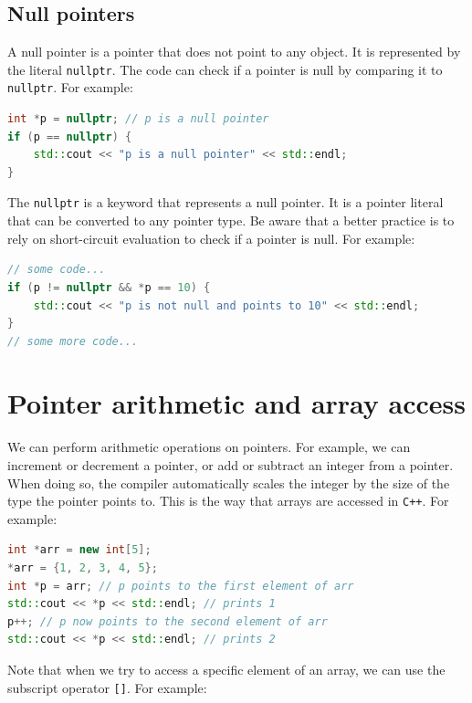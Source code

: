 \subsection{Null pointers}

A null pointer is a pointer that does not point to any object. It is represented by the literal \texttt{nullptr}.
The code can check if a pointer is null by comparing it to \texttt{nullptr}. For example:\\

\begin{lstlisting}[language=C++]
int *p = nullptr; // p is a null pointer
if (p == nullptr) {
    std::cout << "p is a null pointer" << std::endl;
}
\end{lstlisting}

The \texttt{nullptr} is a keyword that represents a null pointer. It is a pointer literal that can be converted to any pointer type.
Be aware that a better practice is to rely on short-circuit evaluation to check if a pointer is null. For example:\\

\begin{lstlisting}[language=C++]
// some code...
if (p != nullptr && *p == 10) {
    std::cout << "p is not null and points to 10" << std::endl;
}
// some more code...
\end{lstlisting}

\section{Pointer arithmetic and array access}

We can perform arithmetic operations on pointers. For example, we can increment or decrement a pointer, or add or subtract an integer
from a pointer. When doing so, the compiler automatically scales the integer by the size of the type the pointer points to. This is the 
way that arrays are accessed in \texttt{C++}. For example:\\

\begin{lstlisting}[language=C++]
int *arr = new int[5];
*arr = {1, 2, 3, 4, 5};
int *p = arr; // p points to the first element of arr
std::cout << *p << std::endl; // prints 1
p++; // p now points to the second element of arr
std::cout << *p << std::endl; // prints 2
\end{lstlisting}

Note that when we try to access a specific element of an array, we can use the subscript operator \texttt{[]}. For example:\\

